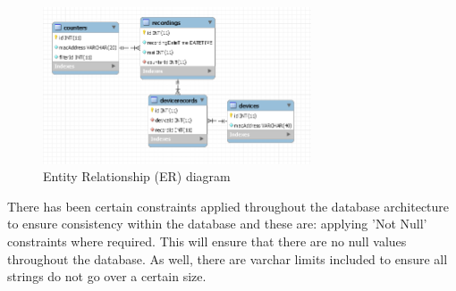 \documentclass{report}
\begin{document}
\begin{figure}[h!]
    \centering
    \includegraphics[width=300]{er_diagram.PNG} 
    \caption{Entity Relationship (ER) diagram}
    \label{fig:ER_diagram}
\end{figure} 

There has been certain constraints applied throughout the database architecture to ensure consistency within the database and these are: applying 'Not Null' constraints where required. This will ensure that there are no null values throughout the database. As well, there are varchar limits included to ensure all strings do not go over a certain size. \\ \newline
\clearpage
\end{document}
